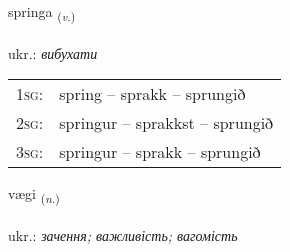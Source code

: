 \documentclass[frontgrid, backgrid]{flacards}\usepackage[]{graphicx}\usepackage[]{xcolor}
\begin{document}
\renewcommand{\flhead}{\vskip5pt \fboxsep=0pt {\small\bfseries\footnotesize Sagnorð | дієслово}}
\renewcommand{\fcfoot}{\vskip5pt \fboxsep=0pt \hspace{2pt}{\small\bfseries\footnotesize 3K}}

\renewcommand{\blhead}{\vskip5pt {\small\bfseries\footnotesize Sagnorð | дієслово }}
\renewcommand{\bcfoot}{\vskip5pt \hspace{2pt}{\small\bfseries\footnotesize 3K}}


{springa \small{\textsubscript{(\textit{v.})}} \\[1ex] %
\textphonetic{[spriŋka]} \\
ukr.: \emph{вибухати} \\  [2ex]
\renewcommand*{\arraystretch}{0.8}
\begin{tabular}{p{1cm}l}
\textsc{1sg}: & spring -- sprakk -- sprungið \\ 
\textsc{2sg}: & springur -- sprakkst -- sprungið \\ 
\textsc{3sg}: & springur -- sprakk -- sprungið \\ 
\end{tabular}
}

\renewcommand{\flhead}{\vskip5pt \fboxsep=0pt {\small\bfseries\footnotesize Nafnorð | іменник}}
\renewcommand{\fcfoot}{\vskip5pt \fboxsep=0pt \hspace{2pt}{\small\bfseries\footnotesize 3K}}

\renewcommand{\blhead}{\vskip5pt {\small\bfseries\footnotesize Nafnorð | іменник }}
\renewcommand{\bcfoot}{\vskip5pt \hspace{2pt}{\small\bfseries\footnotesize 3K}}


{vægi \small{\textsubscript{(\textit{n.})}} \\[1ex] %
\textphonetic{[vaijɪ]} \\
ukr.: \emph{зачення; важливість; вагомість} \\  [2ex]
\renewcommand*{\arraystretch}{0.8}
}
\end{document}
